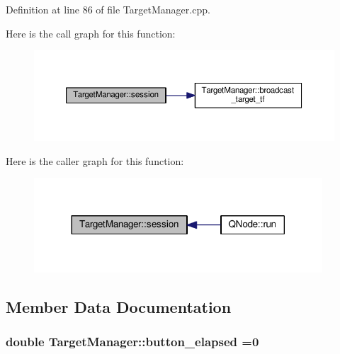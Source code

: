 Definition at line 86 of file Target\+Manager.\+cpp.



Here is the call graph for this function\+:
\nopagebreak
\begin{figure}[H]
\begin{center}
\leavevmode
\includegraphics[width=350pt]{class_target_manager_a4af88c70bb8a0af0171ee9a49536d5c0_cgraph}
\end{center}
\end{figure}




Here is the caller graph for this function\+:
\nopagebreak
\begin{figure}[H]
\begin{center}
\leavevmode
\includegraphics[width=305pt]{class_target_manager_a4af88c70bb8a0af0171ee9a49536d5c0_icgraph}
\end{center}
\end{figure}




\subsection{Member Data Documentation}
\subsubsection[{\texorpdfstring{button\+\_\+elapsed}{button_elapsed}}]{\setlength{\rightskip}{0pt plus 5cm}double Target\+Manager\+::button\+\_\+elapsed =0}\hypertarget{class_target_manager_ac60d6fea0aeb2e64da49bf0a9713b0b2}{}\label{class_target_manager_ac60d6fea0aeb2e64da49bf0a9713b0b2}


